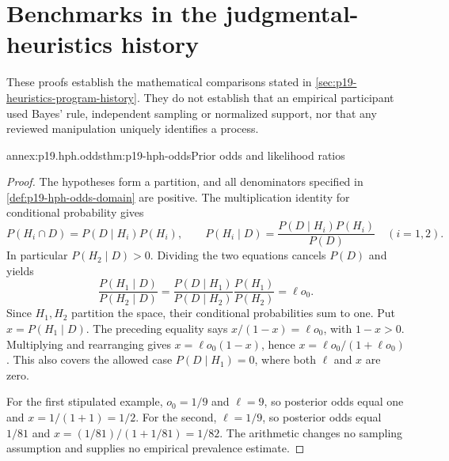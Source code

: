 \section{Benchmarks in the judgmental-heuristics history}
\label{sec:annex-p19-heuristics-program-history}

These proofs establish the mathematical comparisons stated in
\cref{sec:p19-heuristics-program-history}. They do not establish that an
empirical participant used Bayes' rule, independent sampling or normalized
support, nor that any reviewed manipulation uniquely identifies a process.

\begin{annexitem}{annex:p19.hph.odds}{thm:p19-hph-odds}{Prior odds and likelihood ratios}
\begin{proof}
The hypotheses form a partition, and all denominators specified in
\cref{def:p19-hph-odds-domain} are positive. The multiplication identity
for conditional probability gives
\[
 P(H_i\cap D)=P(D\mid H_i)P(H_i),\qquad
 P(H_i\mid D)=\frac{P(D\mid H_i)P(H_i)}{P(D)}
 \quad(i=1,2).
\]
In particular \(P(H_2\mid D)>0\). Dividing the two equations cancels
\(P(D)\) and yields
\[
 \frac{P(H_1\mid D)}{P(H_2\mid D)}
 =\frac{P(D\mid H_1)}{P(D\mid H_2)}
  \frac{P(H_1)}{P(H_2)}=\ell o_0.
\]
Since \(H_1,H_2\) partition the space, their conditional probabilities
sum to one. Put \(x=P(H_1\mid D)\). The preceding equality says
\(x/(1-x)=\ell o_0\), with \(1-x>0\). Multiplying and rearranging
gives \(x=\ell o_0(1-x)\), hence
\(x=\ell o_0/(1+\ell o_0)\). This also covers the allowed case
\(P(D\mid H_1)=0\), where both \(\ell\) and \(x\) are zero.

For the first stipulated example, \(o_0=1/9\) and \(\ell=9\),
so posterior odds equal one and \(x=1/(1+1)=1/2\).
For the second, \(\ell=1/9\), so posterior odds equal \(1/81\)
and \(x=(1/81)/(1+1/81)=1/82\). The arithmetic changes no
sampling assumption and supplies no empirical prevalence estimate.
\end{proof}
\end{annexitem}

